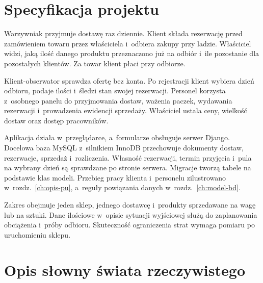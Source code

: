 \documentclass[12pt,a4paper,oneside]{article}
\newcounter{pu}
\begin{document}
\tableofcontents
\clearpage
{}

\section*{Specyfikacja projektu}
\label{sec:specyfikacja}

Warzywniak przyjmuje dostawę raz dziennie. Klient składa rezerwację przed zamówieniem towaru przez właściciela i~odbiera zakupy przy ladzie. Właściciel widzi, jaką ilość danego produktu przeznaczono już na odbiór i~ile pozostanie dla pozostałych klientów. Za towar klient płaci przy odbiorze.

Klient-obserwator sprawdza ofertę bez konta. Po rejestracji klient wybiera dzień odbioru, podaje ilości i~śledzi stan swojej rezerwacji. Personel korzysta z~osobnego panelu do przyjmowania dostaw, ważenia paczek, wydawania rezerwacji i~prowadzenia ewidencji sprzedaży. Właściciel ustala ceny, wielkość dostaw oraz dostęp pracowników.

Aplikacja działa w~przeglądarce, a~formularze obsługuje serwer Django. Docelowa baza MySQL z~silnikiem InnoDB przechowuje dokumenty dostaw, rezerwacje, sprzedaż i~rozliczenia. Własność rezerwacji, termin przyjęcia i~pula na wybrany dzień są sprawdzane po stronie serwera. Migracje tworzą tabele na podstawie klas modeli. Przebieg pracy klienta i~personelu zilustrowano w~rozdz.~\ref{ch:opis-pu}, a~reguły powiązania danych w~rozdz.~\ref{ch:model-bd}.

Zakres obejmuje jeden sklep, jednego dostawcę i~produkty sprzedawane na wagę lub na sztuki. Dane ilościowe w~opisie sytuacji wyjściowej służą do zaplanowania obciążenia i~próby odbioru. Skuteczność ograniczenia strat wymaga pomiaru po uruchomieniu sklepu.


\clearpage
\section{Opis słowny świata rzeczywistego}
\label{ch:swiat}
\end{document}
